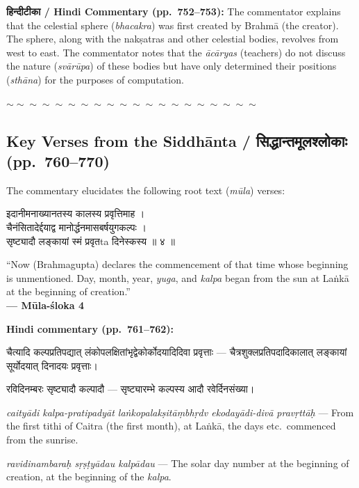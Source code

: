 \documentclass[11pt,a4paper]{article}
\newcommand{\dev}[1]{{\devanagarifont #1}}
\newenvironment{bilingualverse}{%
  \begin{paracol}{2}
  \fontsize{10.5}{13}\selectfont
}{%
  \end{paracol}
  \vspace{0.3cm}
}
\newcommand{\wavydivider}{\begin{center}$\sim\sim\sim\sim\sim\sim\sim\sim\sim\sim\sim\sim\sim\sim\sim\sim\sim\sim\sim\sim$\end{center}}
\newenvironment{paracol}[1]{\begingroup}{\endgroup}
\newenvironment{leftcolumn*}{\begingroup}{\endgroup}
\newenvironment{rightcolumn}{\begingroup}{\endgroup}
\begin{document}
\textbf{\dev{हिन्दीटीका} / Hindi Commentary (pp.\ 752--753):}
The commentator explains that the celestial sphere (\textit{bhacakra}) was first created by Brahmā (the creator). The sphere, along with the nakṣatras and other celestial bodies, revolves from west to east. The commentator notes that the \textit{ācāryas} (teachers) do not discuss the nature (\textit{svārūpa}) of these bodies but have only determined their positions (\textit{sthāna}) for the purposes of computation.

\wavydivider

\subsection*{Key Verses from the Siddhānta / \dev{सिद्धान्तमूलश्लोकाः} (pp.\ 760--770)}

The commentary elucidates the following root text (\textit{mūla}) verses:

\begin{bilingualverse}
\begin{leftcolumn*}
\dev{इदानीमनाख्यानतस्य कालस्य प्रवृत्तिमाह ।}\\
\dev{चैनंसितादेर्द्दयाद्व मानोर्द्धनमासबर्षयुगकल्पः ।}\\
\dev{सृष्ट्यादौ लङ्कायां स्मं प्रवृतta दिनेस्कस्य ॥ ४ ॥}
\end{leftcolumn*}
\begin{rightcolumn}
``Now (Brahmagupta) declares the commencement of that time whose beginning is unmentioned. Day, month, year, \textit{yuga}, and \textit{kalpa} began from the sun at Laṅkā at the beginning of creation.''\\[0.3cm]
\hfill\textbf{— Mūla-śloka 4}
\end{rightcolumn}
\end{bilingualverse}

\textbf{Hindi commentary (pp.\ 761--762):}

\begin{paracol}{2}
\begin{leftcolumn*}
\dev{चैत्यादि कल्पप्रतिपद्यात् लंकोपलक्षितांभृद्वेकोर्कोदयादिदिवा प्रवृत्ताः} — चैत्रशुक्लप्रतिपदादिकालात् लङ्कायां सूर्योदयात् दिनादयः प्रवृत्ताः।

\dev{रविदिनम्बरः सृष्ट्यादौ कल्पादौ} — सृष्ट्यारम्भे कल्पस्य आदौ रवेर्दिनसंख्या।
\end{leftcolumn*}
\begin{rightcolumn}
\textit{caityādi kalpa-pratipadyāt laṅkopalakṣitāṃbhṛdv ekodayādi-divā pravṛttāḥ} --- From the first tithi of Caitra (the first month), at Laṅkā, the days etc.\ commenced from the sunrise.

\textit{ravidinambaraḥ sṛṣṭyādau kalpādau} --- The solar day number at the beginning of creation, at the beginning of the \textit{kalpa}.
\end{rightcolumn}
\end{paracol}
\end{document}
